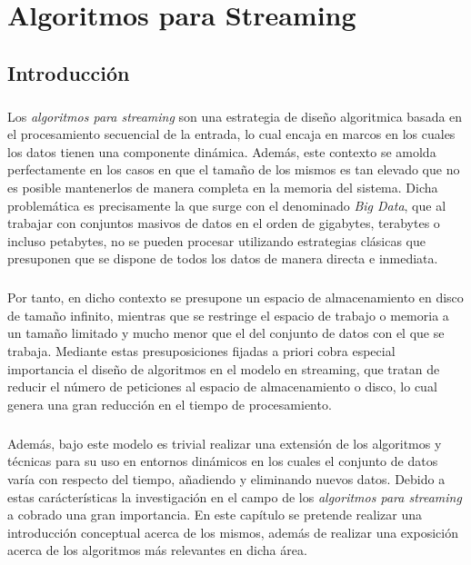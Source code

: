 \documentclass{subfiles}
\begin{document}
  \chapter{Algoritmos para Streaming}
  \label{chapter:streaming}


    \section{Introducción}
    \label{sec:streaming_intro}

      \paragraph{}
      Los \emph{algoritmos para streaming} son una estrategia de diseño algoritmica basada en el procesamiento secuencial de la entrada, lo cual encaja en marcos en los cuales los datos tienen una componente dinámica. Además, este contexto se amolda perfectamente en los casos en que el tamaño de los mismos es tan elevado que no es posible mantenerlos de manera completa en la memoria del sistema. Dicha problemática es precisamente la que surge con el denominado \emph{Big Data}, que al trabajar con conjuntos masivos de datos en el orden de gigabytes, terabytes o incluso petabytes, no se pueden procesar utilizando estrategias clásicas que presuponen que se dispone de todos los datos de manera directa e inmediata.

      \paragraph{}
      Por tanto, en dicho contexto se presupone un espacio de almacenamiento en disco de tamaño infinito, mientras que se restringe el espacio de trabajo o memoria a un tamaño limitado y mucho menor que el del conjunto de datos con el que se trabaja. Mediante estas presuposiciones fijadas a priori cobra especial importancia el diseño de algoritmos en el modelo en streaming, que tratan de reducir el número de peticiones al espacio de almacenamiento o disco, lo cual genera una gran reducción en el tiempo de procesamiento.

      \paragraph{}
      Además, bajo este modelo es trivial realizar una extensión de los algoritmos y técnicas para su uso en entornos dinámicos en los cuales el conjunto de datos varía con respecto del tiempo, añadiendo y eliminando nuevos datos. Debido a estas carácterísticas la investigación en el campo de los \emph{algoritmos para streaming} a cobrado una gran importancia. En este capítulo se pretende realizar una introducción conceptual acerca de los mismos, además de realizar una exposición acerca de los algoritmos más relevantes en dicha área.
\end{document}
